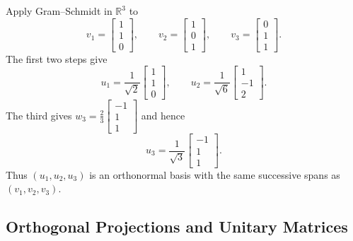 \begin{Example}
Apply Gram--Schmidt in $\mathbb R^3$ to
\begin{equation*}
v_1=\begin{bmatrix}1\\1\\0\end{bmatrix},\qquad v_2=\begin{bmatrix}1\\0\\1\end{bmatrix},\qquad v_3=\begin{bmatrix}0\\1\\1\end{bmatrix}.
\end{equation*}
The first two steps give
\begin{equation*}
u_1=\frac1{\sqrt2}\begin{bmatrix}1\\1\\0\end{bmatrix},\qquad
u_2=\frac1{\sqrt6}\begin{bmatrix}1\\-1\\2\end{bmatrix}.
\end{equation*}
The third gives $w_3=\frac23\begin{bmatrix}-1\\1\\1\end{bmatrix}$ and hence
\begin{equation*}
u_3=\frac1{\sqrt3}\begin{bmatrix}-1\\1\\1\end{bmatrix}.
\end{equation*}
Thus $(u_1,u_2,u_3)$ is an orthonormal basis with the same successive spans as $(v_1,v_2,v_3)$.
\end{Example}

\subsection{Orthogonal Projections and Unitary Matrices}

